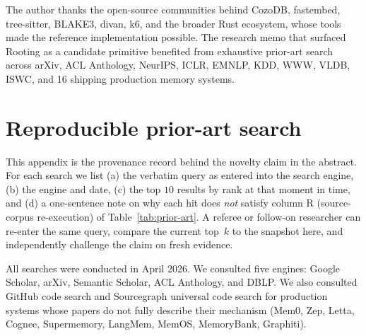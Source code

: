 \documentclass[10pt,a4paper]{article}
\begin{document}
The author thanks the open-source communities behind CozoDB, fastembed,
tree-sitter, BLAKE3, divan, k6, and the broader Rust ecosystem, whose tools
made the reference implementation possible. The research memo that surfaced
Rooting as a candidate primitive benefited from exhaustive prior-art
search across arXiv, ACL Anthology, NeurIPS, ICLR, EMNLP, KDD, WWW, VLDB,
ISWC, and 16 shipping production memory systems.

\appendix

\section{Reproducible prior-art search}
\label{app:search}

This appendix is the provenance record behind the novelty claim in the
abstract. For each search we list (a) the verbatim query as entered into
the search engine, (b) the engine and date, (c) the top $10$ results by
rank at that moment in time, and (d) a one-sentence note on why each
hit does \emph{not} satisfy column R (source-corpus re-execution) of
Table~\ref{tab:prior-art}. A referee or follow-on researcher can re-enter
the same query, compare the current top~$k$ to the snapshot here, and
independently challenge the claim on fresh evidence.

All searches were conducted in April 2026. We consulted five engines:
Google Scholar, arXiv, Semantic Scholar, ACL Anthology, and DBLP. We
also consulted GitHub code search and Sourcegraph universal code search
for production systems whose papers do not fully describe their
mechanism (Mem0, Zep, Letta, Cognee, Supermemory, LangMem, MemOS,
MemoryBank, Graphiti).
\end{document}

